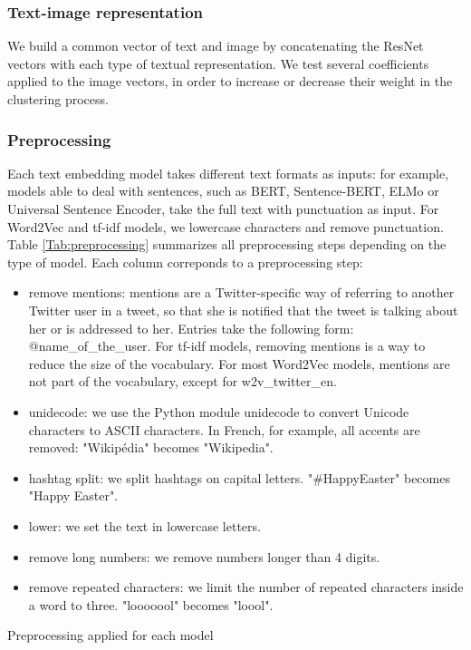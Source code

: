 \subsubsection{Text-image representation}

We build a common vector of text and image by concatenating the ResNet vectors with each type of textual representation. We test several coefficients applied to the image vectors, in order to increase or decrease their weight in the clustering process.

\subsubsection{Preprocessing}

Each text embedding model takes different text formats as inputs: for example, models able to deal with sentences, such as BERT, Sentence-BERT, ELMo or Universal Sentence Encoder, take the full text with punctuation as input. For Word2Vec and tf-idf models, we lowercase characters and remove punctuation. Table \ref{Tab:preprocessing} summarizes all preprocessing steps depending on the type of model. Each column correponds to a preprocessing step:
\begin{itemize}
    \item remove mentions: mentions are a Twitter-specific way of referring to another Twitter user in a tweet, so that she is notified that the tweet is talking about her or is addressed to her. Entries take the following form: @name\_of\_the\_user. For tf-idf models, removing mentions is a way to reduce the size of the vocabulary. For most Word2Vec models, mentions are not part of the vocabulary, except for w2v\_twitter\_en.
    \item unidecode: we use the Python module unidecode to convert Unicode characters to ASCII characters. In French, for example, all accents are removed: "Wikipédia" becomes "Wikipedia".
    \item hashtag split: we split hashtags on capital letters. "\#HappyEaster" becomes "Happy Easter".
    \item lower: we set the text in lowercase letters.
    \item remove long numbers: we remove numbers longer than 4 digits.
    \item remove repeated characters: we limit the number of repeated characters inside a word to three. "looooool" becomes "loool".
\end{itemize}

\begin{table}
\begin{center}
\end{center}
\caption{Preprocessing applied for each model \label{Tab:preprocessing}}
\end{table}

